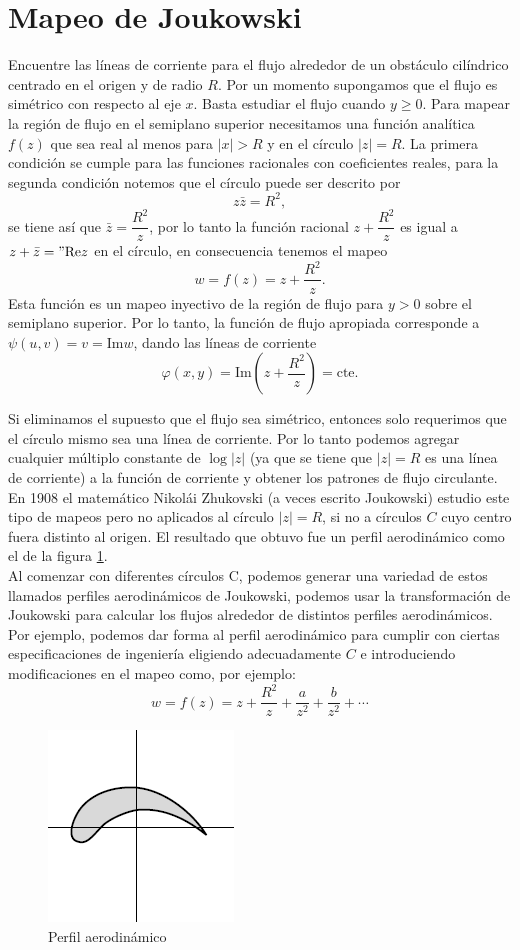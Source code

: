 \section{Mapeo de Joukowski} \label{Joukowski}


\begin{Ejem}
	Encuentre las líneas de corriente para el flujo alrededor de un obstáculo cilíndrico centrado en el origen y de radio $R$.
	\solu
	Por un momento supongamos que el flujo es simétrico con respecto al eje $x$. Basta estudiar el flujo cuando $y\geq 0$. Para mapear la región de flujo en el semiplano superior necesitamos una función analítica $f(z)$ que sea real al menos para $|x|>R$ y en el círculo $|z|=R$. La primera condición se cumple para las funciones racionales con coeficientes reales, para la segunda condición notemos que el círculo puede ser descrito por
	$$z\bar{z}=R^2,$$
	se tiene así que $\bar{z}=\dfrac{R^2}{z}$, por lo tanto la función racional $z+\dfrac{R^2}{z}$ es igual a $z+\bar{z}="\mbox{Re}z$  en el círculo, en consecuencia tenemos el mapeo
	$$w=f(z)=z+\dfrac{R^2}{z}.$$
	Esta función es un mapeo inyectivo de la región de flujo para $y>0$ sobre el semiplano superior. Por lo tanto, la función de flujo apropiada corresponde a $\psi(u, v) = v = \mbox{Im}w$, dando las líneas de corriente
	$$\varphi(x,y)=\mbox{Im}\left(z+\dfrac{R^2}{z}\right)=\mbox{cte}.$$\endproof
	
\end{Ejem}



Si eliminamos el supuesto que el flujo sea simétrico, entonces solo requerimos que el círculo mismo sea una línea de corriente. Por lo tanto podemos agregar cualquier múltiplo constante  de $\log |z|$ (ya que se tiene que $|z|=R$ es una línea de corriente) a la función de corriente y obtener los patrones de flujo circulante.\\

En 1908 el matemático Nikolái Zhukovski  (a veces escrito Joukowski) estudio este tipo de mapeos pero no aplicados al círculo $|z|=R$, si no a círculos $C$ cuyo centro fuera distinto al origen. El resultado que obtuvo fue un perfil aerodinámico como el de la figura \ref{fig:24}.\\Al comenzar con diferentes círculos C, podemos generar una variedad de estos llamados perfiles aerodinámicos de Joukowski, podemos usar la transformación de Joukowski para calcular los flujos alrededor de distintos perfiles aerodinámicos. Por ejemplo, podemos dar forma al perfil aerodinámico para cumplir con ciertas especificaciones de ingeniería eligiendo adecuadamente $C$ e introduciendo modificaciones en el mapeo como, por ejemplo:
$$w=f(z)=z+\dfrac{R^2}{z}+\dfrac{a}{z^2}+\dfrac{b}{z^2}+\cdots$$
\begin{figure}[h!]
	\centering
	\includegraphics[width=0.2\linewidth]{img/24}
	\caption{Perfil aerodinámico}
	\label{fig:24}
\end{figure}
 


